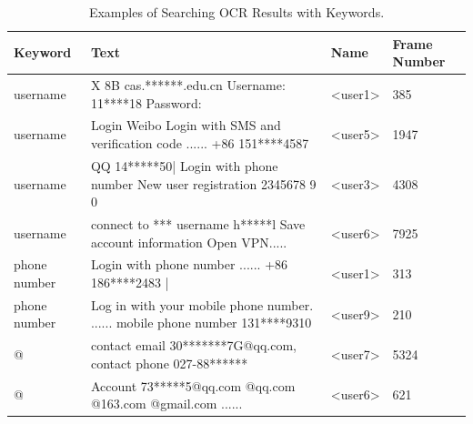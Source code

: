 \begin{table}[t]
	\centering
	\begin{tabular}{|l|l|l|l|}
		\hline
		\textbf{Keyword} & \textbf{Text}                                                             & \textbf{Name}                                   & \textbf{Frame Number} \\ \hline
		username                          & X 8B cas.******.edu.cn Username: 11****18 Password:                                        & \textless{}user1\textgreater{} & 385                                    \\ \hline
		username                          & Login Weibo Login with SMS and verification code ...... +86 151****4587                    & \textless{}user5\textgreater{} & 1947                                   \\ \hline
		username                          & QQ 14*****50| Login with phone number New user registration 2345678 9 0                    & \textless{}user3\textgreater{} & 4308                                   \\ \hline
		username                          & connect to *** username h*****l Save account information Open VPN.....                     & \textless{}user6\textgreater{} & 7925                                   \\ \hline
		phone number                      & Login with phone number ...... +86 186****2483 |                                           & \textless{}user1\textgreater{} & 313                                    \\ \hline
		phone number                      & Log in with your mobile phone number. ...... mobile phone number 131****9310 & \textless{}user9\textgreater{} & 210                                    \\ \hline
		@                                 & contact email 30*******7G@qq.com, contact phone 027-88******                               & \textless{}user7\textgreater{} & 5324                                   \\ \hline
		@                                 & Account 73*****5@qq.com @qq.com @163.com @gmail.com 	......      & \textless{}user6\textgreater{} & 621                                    \\ \hline
	\end{tabular}
	\linebreak
	\caption{Examples of Searching OCR Results with Keywords.}
	\label{tab:ocr_keyword_example}
\end{table}

